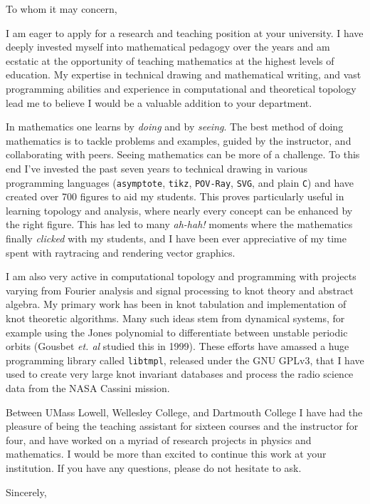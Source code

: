 \documentclass{letter}
\begin{document}
    \begin{letter}{}
        \opening{To whom it may concern,}
            I am eager to apply for a research and teaching
            position at your university.
            I have deeply invested myself into mathematical pedagogy over the
            years and am ecstatic at the opportunity of teaching mathematics
            at the highest levels of education. My expertise in technical
            drawing and mathematical writing, and vast programming abilities
            and experience in computational and theoretical topology lead me to
            believe I would be a valuable addition to your department.
            \par
            In mathematics one learns by \textit{doing} and by \textit{seeing}.
            The best method of doing mathematics is to tackle problems and
            examples, guided by the instructor, and collaborating with peers.
            Seeing mathematics can be more of a challenge. To this end I've
            invested the past seven years to technical drawing in various
            programming languages (\texttt{asymptote},
            \texttt{tikz}, \texttt{POV-Ray}, \texttt{SVG}, and plain
            \texttt{C}) and have created over 700 figures to aid my students.
            This proves particularly useful in learning topology and analysis,
            where nearly every concept can be enhanced by the right figure.
            This has led to many \textit{ah-hah!} moments where the mathematics
            finally \textit{clicked} with my students, and I have been ever
            appreciative of my time spent with raytracing and rendering
            vector graphics.
            \par
            I am also very active in computational topology and programming
            with projects varying from Fourier analysis and signal processing
            to knot theory and abstract algebra. My primary work has been in
            knot tabulation and implementation of knot theoretic algorithms.
            Many such ideas stem from dynamical systems, for example using the
            Jones polynomial to differentiate between unstable periodic orbits
            (Gousbet \textit{et. al} studied this in 1999). These efforts have
            amassed a huge programming library called \texttt{libtmpl},
            released under the GNU GPLv3, that I have used to create very
            large knot invariant databases and process the radio science
            data from the NASA Cassini mission.
            \par
            Between UMass Lowell, Wellesley College, and Dartmouth College I
            have had the pleasure of being the teaching assistant for sixteen
            courses and the instructor for four, and have worked on a myriad of
            research projects in physics and mathematics. I would be more than
            excited to continue this work at your institution. If you have any
            questions, please do not hesitate to ask.
        \closing{Sincerely,}
    \end{letter}
\end{document}

